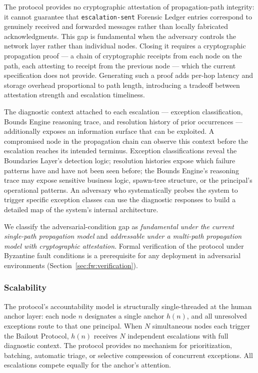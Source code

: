 The protocol provides no cryptographic attestation of propagation-path integrity: it cannot guarantee that \texttt{escalation-sent} Forensic Ledger entries correspond to genuinely received and forwarded messages rather than locally fabricated acknowledgments. This gap is fundamental when the adversary controls the network layer rather than individual nodes. Closing it requires a cryptographic propagation proof --- a chain of cryptographic receipts from each node on the path, each attesting to receipt from the previous node --- which the current specification does not provide. Generating such a proof adds per-hop latency and storage overhead proportional to path length, introducing a tradeoff between attestation strength and escalation timeliness.

The diagnostic context attached to each escalation --- exception classification, Bounds Engine reasoning trace, and resolution history of prior occurrences --- additionally exposes an information surface that can be exploited. A compromised node in the propagation chain can observe this context before the escalation reaches its intended terminus. Exception classifications reveal the Boundaries Layer's detection logic; resolution histories expose which failure patterns have and have not been seen before; the Bounds Engine's reasoning trace may expose sensitive business logic, spawn-tree structure, or the principal's operational patterns. An adversary who systematically probes the system to trigger specific exception classes can use the diagnostic responses to build a detailed map of the system's internal architecture.

We classify the adversarial-condition gap as \emph{fundamental under the current single-path propagation model} and \emph{addressable under a multi-path propagation model with cryptographic attestation}. Formal verification of the protocol under Byzantine fault conditions is a prerequisite for any deployment in adversarial environments (Section~\ref{sec:fw:verification}).

\subsubsection{Scalability}
\label{sec:lim:scalability}

The protocol's accountability model is structurally single-threaded at the human anchor layer: each node $n$ designates a single anchor $h(n)$, and all unresolved exceptions route to that one principal. When $N$ simultaneous nodes each trigger the Bailout Protocol, $h(n)$ receives $N$ independent escalations with full diagnostic context. The protocol provides no mechanism for prioritization, batching, automatic triage, or selective compression of concurrent exceptions. All escalations compete equally for the anchor's attention.

